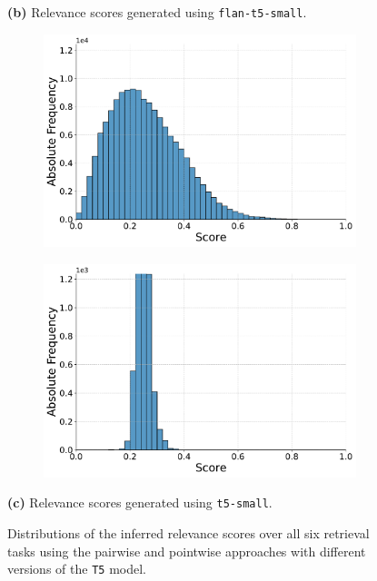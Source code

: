 \begin{figure}[t!]
    \vspace{-0.5cm}
    \textbf{(b)} Relevance scores generated using \texttt{flan-t5-small}.
    \vspace{0.5cm}

    \begin{subfigure}[b]{0.49\textwidth}
        \centering
        \includegraphics[width=\textwidth]{graphics/seaborn/pairwise_cw22_score_distribution_t5-small.pdf}
        \label{fig:pairwise_t5-small}
    \end{subfigure}
    \hfill
    \begin{subfigure}[b]{0.49\textwidth}
        \centering
        \includegraphics[width=\textwidth]{graphics/seaborn/pointwise_cw22_score_distribution_t5-small.pdf}
        \label{fig:pointwise_t5-small}
    \end{subfigure}

    \vspace{-0.5cm}
    \textbf{(c)} Relevance scores generated using \texttt{t5-small}.
    \vspace{0.5cm}

    \caption{Distributions of the inferred relevance scores over all six retrieval tasks using the pairwise and pointwise approaches with different versions of the \texttt{T5} model.}
    \label{fig:score-distributions}
\end{figure}